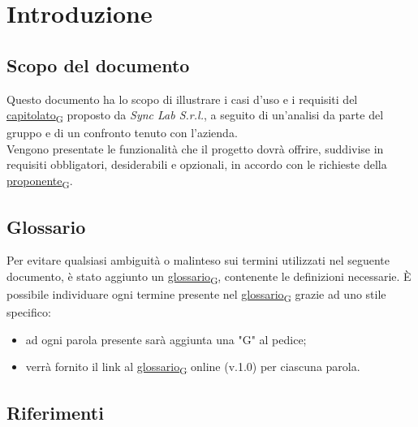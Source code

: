 \section{Introduzione}
\setcounter{subsection}{0}
\subsection{Scopo del documento}
Questo documento ha lo scopo di illustrare i casi d'uso e i requisiti del \href{https://7last.github.io/docs/rtb/documentazione-interna/glossario\#capitolato}{capitolato\textsubscript{G}}
proposto da \textit{Sync Lab S.r.l.}, a seguito di un'analisi da parte del gruppo e di un confronto tenuto con l'azienda.\\
Vengono presentate le funzionalità che il progetto dovrà offrire, suddivise in requisiti obbligatori, desiderabili e opzionali, in accordo con le richieste della \href{https://7last.github.io/docs/rtb/documentazione-interna/glossario\#proponente}{proponente\textsubscript{G}}.

\subsection{Glossario}
Per evitare qualsiasi ambiguità o malinteso sui termini utilizzati nel seguente documento, è stato aggiunto un \href{https://7last.github.io/docs/rtb/documentazione-interna/glossario\#glossario}{glossario\textsubscript{G}},  contenente le definizioni necessarie. È possibile individuare ogni termine presente nel \href{https://7last.github.io/docs/rtb/documentazione-interna/glossario\#glossario}{glossario\textsubscript{G}} grazie ad uno stile specifico:
\begin{itemize}
	\item ad ogni parola presente sarà aggiunta una "G" al pedice;
	\item verrà fornito il link al \href{https://7last.github.io/docs/rtb/documentazione-interna/glossario\#glossario}{glossario\textsubscript{G}} online (v.1.0) per ciascuna parola.
\end{itemize}

\subsection{Riferimenti}
